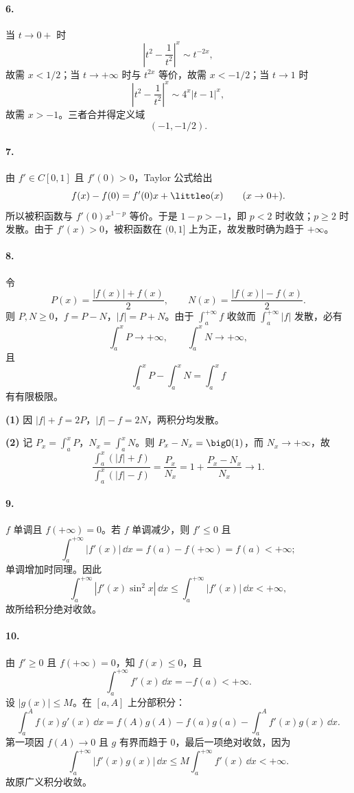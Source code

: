 \paragraph{6.}
当 $t\to0+$ 时
\[
  \left|t^2-\frac1{t^2}\right|^x\sim t^{-2x},
\]
故需 $x<1/2$；当 $t\to+\infty$ 时与 $t^{2x}$ 等价，故需 $x<-1/2$；当 $t\to1$ 时
\[
  \left|t^2-\frac1{t^2}\right|^x\sim4^x|t-1|^x,
\]
故需 $x>-1$。三者合并得定义域
\[
  \boxed{(-1,-1/2)}.
\]

\paragraph{7.}
由 $f'\in C[0,1]$ 且 $f'(0)>0$，Taylor 公式给出
\[
  f(x)-f(0)=f'(0)x+\littleo(x)\qquad(x\to0+).
\]
所以被积函数与 $f'(0)x^{1-p}$ 等价。于是 $1-p>-1$，即 $p<2$ 时收敛；$p\geq2$ 时发散。由于 $f'(x)>0$，被积函数在 $(0,1]$ 上为正，故发散时确为趋于 $+\infty$。

\paragraph{8.}
令
\[
  P(x)=\frac{|f(x)|+f(x)}2,\qquad N(x)=\frac{|f(x)|-f(x)}2.
\]
则 $P,N\geq0$，$f=P-N$，$|f|=P+N$。由于 $\int_a^{+\infty}f$ 收敛而 $\int_a^{+\infty}|f|$ 发散，必有
\[
  \int_a^xP\to+\infty,\qquad \int_a^xN\to+\infty,
\]
且
\[
  \int_a^xP-\int_a^xN=\int_a^x f
\]
有有限极限。

\textbf{(1)} 因 $|f|+f=2P$，$|f|-f=2N$，两积分均发散。

\textbf{(2)} 记 $P_x=\int_a^xP$，$N_x=\int_a^xN$。则 $P_x-N_x=\bigO(1)$，而 $N_x\to+\infty$，故
\[
  \frac{\int_a^x(|f|+f)}{\int_a^x(|f|-f)}
  =\frac{P_x}{N_x}=1+\frac{P_x-N_x}{N_x}\to1.
\]

\paragraph{9.}
$f$ 单调且 $f(+\infty)=0$。若 $f$ 单调减少，则 $f'\leq0$ 且
\[
  \int_a^{+\infty}|f'(x)|\,\dd x
  =f(a)-f(+\infty)=f(a)<+\infty;
\]
单调增加时同理。因此
\[
  \int_a^{+\infty}|f'(x)\sin^2x|\,\dd x
  \leq\int_a^{+\infty}|f'(x)|\,\dd x<+\infty,
\]
故所给积分绝对收敛。

\paragraph{10.}
由 $f'\geq0$ 且 $f(+\infty)=0$，知 $f(x)\leq0$，且
\[
  \int_a^{+\infty}f'(x)\,\dd x=-f(a)<+\infty.
\]
设 $|g(x)|\leq M$。在 $[a,A]$ 上分部积分：
\[
  \int_a^A f(x)g'(x)\,\dd x
  =f(A)g(A)-f(a)g(a)-\int_a^A f'(x)g(x)\,\dd x.
\]
第一项因 $f(A)\to0$ 且 $g$ 有界而趋于 $0$，最后一项绝对收敛，因为
\[
  \int_a^{+\infty}|f'(x)g(x)|\,\dd x\leq M\int_a^{+\infty}f'(x)\,\dd x<+\infty.
\]
故原广义积分收敛。

